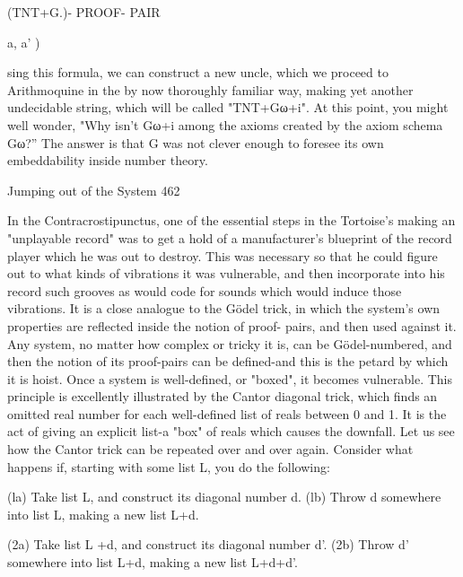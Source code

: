                             (TNT+G.)- PROOF- PAIR{a, a' )

sing this formula, we can construct a new uncle, which we proceed to Arithmoquine in
the by now thoroughly familiar way, making yet another undecidable string, which will
be called "TNT+Gω+i". At this point, you might well wonder, "Why isn't Gω+i among
the axioms created by the axiom schema Gω?” The answer is that G was not clever
enough to foresee its own embeddability inside number theory.




Jumping out of the System                                                               462

In the Contracrostipunctus, one of the essential steps in the Tortoise's making an
"unplayable record" was to get a hold of a manufacturer's blueprint of the record player
which he was out to destroy. This was necessary so that he could figure out to what kinds
of vibrations it was vulnerable, and then incorporate into his record such grooves as
would code for sounds which would induce those vibrations. It is a close analogue to the
Gödel trick, in which the system's own properties are reflected inside the notion of proof-
pairs, and then used against it. Any system, no matter how complex or tricky it is, can be
Gödel-numbered, and then the notion of its proof-pairs can be defined-and this is the
petard by which it is hoist. Once a system is well-defined, or "boxed", it becomes
vulnerable.
        This principle is excellently illustrated by the Cantor diagonal trick, which finds
an omitted real number for each well-defined list of reals between 0 and 1. It is the act of
giving an explicit list-a "box" of reals which causes the downfall. Let us see how the
Cantor trick can be repeated over and over again. Consider what happens if, starting with
some list L, you do the following:

       (la) Take list L, and construct its diagonal number d.
       (lb) Throw d somewhere into list L, making a new list L+d.

       (2a) Take list L +d, and construct its diagonal number d'.
       (2b) Throw d' somewhere into list L+d, making a new list L+d+d'.

}
